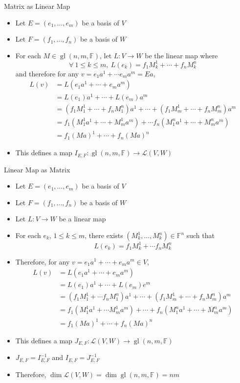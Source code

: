 \documentclass[usenames,dvipsnames,10pt]{beamer}
\newcommand\F{\mathbb{F}}
\newcommand{\gl}{\operatorname{gl}}
\renewcommand{\L}{\mathcal{L}}
\begin{document}
\begin{frame}
  {Matrix as Linear Map}

  \begin{itemize}
  \item Let $E = (e_1, \dots, e_m)$ be a basis of $V$
  \item Let $F = (f_1, \dots, f_n)$ be a basis of $W$
  \item For each $M \in \gl(n,m,\F)$, let $L: V \rightarrow W$ be the linear map where
    \[
      \forall\ 1 \le k \le m,\ L(e_k) = f_1M_k^1 + \cdots + f_nM_k^n
    \]
    and therefore for any $v = e_1a^1+\cdots e_ma^m = Ea$,
    \begin{align*}
      L(v) &= L(e_1a^1+ \cdots + e_ma^m)\\
           &= L(e_1)a^1 + \cdots + L(e_m)a^m\\
           &= (f_1M_1^1+\cdots+f_nM_1^n)a^1 + \cdots +(f_1M_m^1+\cdots+f_nM_m^n)a^m\\
           &= f_1(M_1^1a^1+\cdots+M_m^1a^m) + \cdots f_n(M_1^na^1+\cdots+M_m^na^m)\\
           &= f_1(Ma)^1+ \cdots + f_n(Ma)^n
    \end{align*}
  \item This defines a map $I_{E,F}: \gl(n,m,\F) \rightarrow \L(V,W)$
  \end{itemize}
\end{frame}

\begin{frame}
  {Linear Map as Matrix}

  \begin{itemize}
  \item Let $E = (e_1, \dots, e_m)$ be a basis of $V$
  \item Let $F = (f_1, \dots, f_n)$ be a basis of $W$
  \item Let $L: V \rightarrow W$ be a linear map
  \item For each $e_k$, $1 \le k \le m$, there exists $(M_k^1, \dots, M_k^n) \in \F^n$ such that
    \[ L(e_k) = f_1M_k^1 + \cdots f_nM_k^n \]
  \item Therefore, for any
    $v = e_1a^1 + \cdots + e_ma^m \in V$,
    \begin{align*}
      L(v) &= L(e_1a^1+\cdots+e_ma^m)\\
           &= L(e_1)a^1 + \cdots + L(e_m)e^m\\
           &= (f_1M_1^1+\cdots f_nM^n_1)a^1
             + \cdots + (f_1M_m^1+\cdots+f_nM_m^n)a^m\\
           &= f_1(M_1^1a^1 + \cdots M_m^1a^m) + \cdots + f_n(M_1^na^1+ \cdots + M_m^na^m)\\
           &= f_1(Ma)^1 + \cdots + f_n(Ma)^n
    \end{align*}
  \item This defines a map $J_{E,F}: \L(V,W) \rightarrow \gl(n,m,\F)$\\
  \item $J_{E,F} = I_{E,F}^{-1}$ and $I_{E,F} = J_{E,F}^{-1}$
  \item Therefore, $\dim \L(V,W) = \dim \gl(n,m,\F) = nm$
  \end{itemize}
\end{frame}
\end{document}
